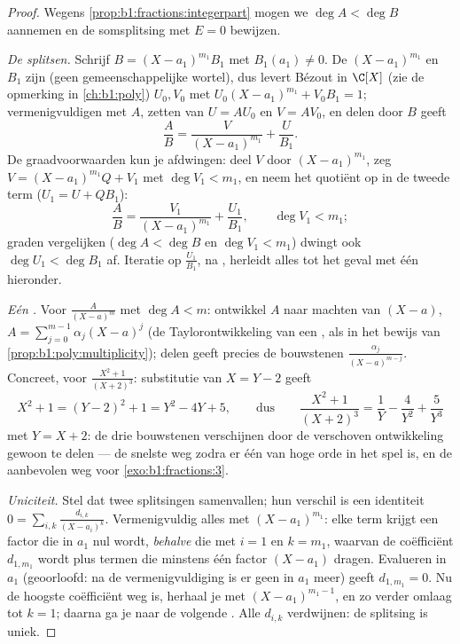 \begin{proof}
Wegens \cref{prop:b1:fractions:integerpart} mogen we $\deg A < \deg B$
aannemen en de somsplitsing met $E = 0$ bewijzen.

\emph{De  splitsen.} Schrijf $B = (X - a_1)^{m_1} B_1$ met $B_1(a_1)
\neq 0$. De  $(X-a_1)^{m_1}$ en $B_1$ zijn  (geen
gemeenschappelijke wortel), dus levert Bézout in $\C[X]$ (zie de opmerking
in \cref{ch:b1:poly}) $U_0, V_0$ met $U_0 (X-a_1)^{m_1} + V_0 B_1 = 1$;
vermenigvuldigen met $A$, zetten van $U = AU_0$ en $V = AV_0$, en delen
door $B$ geeft
\[
\frac AB = \frac{V}{(X - a_1)^{m_1}} + \frac{U}{B_1} .
\]
De graadvoorwaarden kun je afdwingen: deel $V$ door $(X-a_1)^{m_1}$, zeg
$V = (X-a_1)^{m_1}Q + V_1$ met $\deg V_1 < m_1$, en neem het quotiënt op
in de tweede term ($U_1 = U + QB_1$):
\[
\frac AB = \frac{V_1}{(X - a_1)^{m_1}} + \frac{U_1}{B_1},
\qquad \deg V_1 < m_1 ;
\]
graden vergelijken ($\deg A < \deg B$ en $\deg V_1 < m_1$) dwingt ook
$\deg U_1 < \deg B_1$ af. Iteratie op $\frac{U_1}{B_1}$,  na ,
herleidt alles tot het geval met één  hieronder.

\emph{Eén .} Voor $\frac{A}{(X-a)^m}$ met $\deg A < m$: ontwikkel $A$
naar machten van $(X - a)$, $A = \sum_{j=0}^{m-1} \alpha_j (X - a)^j$ (de
Taylorontwikkeling van een , als in het bewijs van
\cref{prop:b1:poly:multiplicity}); delen geeft precies de bouwstenen
$\frac{\alpha_j}{(X-a)^{m-j}}$. Concreet, voor $\frac{X^2 +
1}{(X+2)^3}$: substitutie van $X = Y - 2$ geeft
\[
X^2 + 1 = (Y - 2)^2 + 1 = Y^2 - 4Y + 5 ,
\qquad\text{dus}\qquad
\frac{X^2+1}{(X+2)^3} = \frac1{Y} - \frac4{Y^2} + \frac5{Y^3}
\]
met $Y = X + 2$: de drie bouwstenen verschijnen door de verschoven
ontwikkeling gewoon te delen --- de snelste weg zodra er één  van hoge
orde in het spel is, en de aanbevolen weg voor
\cref{exo:b1:fractions:3}.

\emph{Uniciteit.} Stel dat twee splitsingen samenvallen; hun verschil is
een identiteit $0 = \sum_{i,k} \frac{d_{i,k}}{(X - a_i)^k}$.
Vermenigvuldig alles met $(X - a_1)^{m_1}$: elke term krijgt een factor
die in $a_1$ nul wordt, \emph{behalve} die met $i = 1$ en $k = m_1$,
waarvan de coëfficiënt $d_{1,m_1}$ wordt plus termen die minstens één
factor $(X - a_1)$ dragen. Evalueren in $a_1$ (geoorloofd: na de
vermenigvuldiging is er geen  in $a_1$ meer) geeft $d_{1,m_1} = 0$.
Nu de hoogste coëfficiënt weg is, herhaal je met $(X - a_1)^{m_1 - 1}$,
en zo verder omlaag tot $k = 1$; daarna ga je naar de volgende . Alle
$d_{i,k}$ verdwijnen: de splitsing is uniek.
\end{proof}

